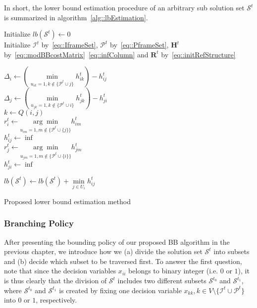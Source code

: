 %
In short, the lower bound estimation procedure of an arbitrary sub solution set $\mathcal{S}^t$ is summarized in algorithm~\ref{alg::lbEstimation}.
%
\IncMargin{1em}
\begin{algorithm}[]
 \SetAlgoLined
 \BlankLine
 Initialize $lb(\mathcal{S}^t) \gets 0$\\
 Initialize $\mathcal{I}^t$ by~\eqref{eq::IframeSet}, $\mathcal{P}^t$ by~\eqref{eq::PframeSet}, $\mathbf{H}^t$ by~\eqref{eq::modBBcostMatrix}~\eqref{eq::infColumn} and $\mathbf{R}^t$ by~\eqref{eq::initRefStructure} \\
 {
 	$\Delta_i \gets \left( \underset{u_{ik}=1, k \notin \{\mathcal{P}^t \cup j\}}{\min} h_{ik}^t \right) - h_{ij}^t$ \\
	$\Delta_j \gets \left( \underset{u_{jk}=1, k \notin \{\mathcal{P}^t \cup i\}}{\min} h_{jk}^t \right) - h_{ji}^t$ \\
 	$k \gets Q(i,j)$ \\
 	{
 		$r_i^t \gets \underset{u_{im}=1, m \notin \{\mathcal{P}^t \cup \{j\}\}}{\arg \min} h_{im}^t$ \\
 		$h_{ij}^t \gets \inf$ \\
 	}
 	{
 		$r_j^t \gets \underset{u_{jm}=1, m \notin \{\mathcal{P}^t \cup \{i\}\}}{\arg \min} h_{jm}^t$ \\
 		$h_{ji}^t \gets \inf$ \\
 	}
 	
 }
 {
 	$lb(\mathcal{S}^t) \gets lb(\mathcal{S}^t) + \underset{j \in U_i}{\min} h_{ij}^t$ \\
 }
 \caption{\label{alg::lbEstimation}Proposed lower bound estimation method}
\end{algorithm}
\DecMargin{1em}
%
\subsubsection{Branching Policy}
After presenting the bounding policy of our proposed BB algorithm in the previous chapter, we introduce how we (a) divide the solution set $\mathcal{S}^t$ into subsets and (b) decide which subset to be traversed first.
To answer the first question, note that since the decision variables $x_{ii}$ belongs to binary integer (i.e. $0$ or $1$), it is thus clearly that the division of $\mathcal{S}^t$ includes two different subsets $\mathcal{S}^{t_0}$ and $\mathcal{S}^{t_1}$, where  $\mathcal{S}^{t_0}$ and $\mathcal{S}^{t_1}$ is created by fixing one decision variable ${x_{kk},k \in V \setminus \{\mathcal{I}^t \cup \mathcal{P}^t\} }$ into $0$ or $1$, respectively.

